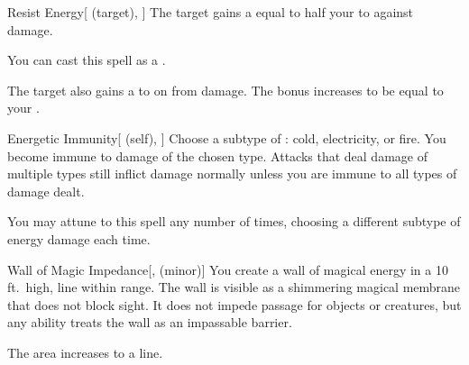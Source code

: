 \lowercase{\hypertarget{spell:Resist Energy}{}}\label{spell:Resist Energy}
\begin{attuneability}[Rank 4]{\hypertarget{spell:Resist Energy}{Resist Energy}}[ (target), ]
The target gains a  equal to half your  to  against  damage.

You can cast this spell as a .

\rankline
{} The target also gains a   to  on  from  damage.
 The bonus increases to be equal to your .
\end{attuneability}
\vspace{0.25em}



\lowercase{\hypertarget{spell:Energetic Immunity}{}}\label{spell:Energetic Immunity}
\begin{attuneability}[Rank 5]{\hypertarget{spell:Energetic Immunity}{Energetic Immunity}}[ (self), ]
Choose a subtype of : cold, electricity, or fire.
You become immune to damage of the chosen type.
Attacks that deal damage of multiple types still inflict damage normally unless you are immune to all types of damage dealt.

\rankline
{} You may attune to this spell any number of times, choosing a different subtype of energy damage each time.
\end{attuneability}
\vspace{0.25em}



\lowercase{\hypertarget{spell:Wall of Magic Impedance}{}}\label{spell:Wall of Magic Impedance}
\begin{freeability}[Rank 5]{\hypertarget{spell:Wall of Magic Impedance}{Wall of Magic Impedance}}[,  (minor)]
\targetrule
You create a wall of magical energy in a 10 ft.\ high, \areamed line within \rngmed range.
The wall is visible as a shimmering magical membrane that does not block sight.
It does not impede passage for objects or creatures, but any  ability treats the wall as an impassable barrier.

\rankline
{} The area increases to a \arealarge line.
\end{freeability}
\vspace{0.25em}



